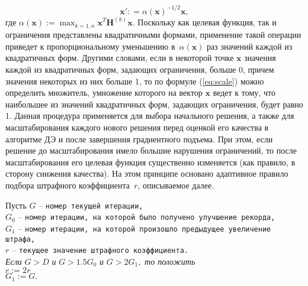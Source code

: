 \begin{equation}
    \textbf{x}': =\alpha(\textbf{x})^{-1/2} \textbf{x} ,
    \label{eq:scale}
\end{equation}
где $\alpha(\textbf{x}):=\max_{k=\overline{1,n}} \textbf{x}^T \textbf{H}^{(k)}\textbf{x}$. Поскольку как целевая функция, так и
ограничения представлены квадратичными формами, применение такой операции приведет к пропорциональному уменьшению
в~$\alpha(\textbf{x})$ раз значений каждой из квадратичных форм. Другими словами, если в некоторой точке $\textbf{x}$
значения каждой из квадратичных форм, задающих ограничения, больше 0, причем значения некоторых из них
больше 1, то по формуле (\ref{eq:scale}) можно определить множитель, умножение которого на вектор $\textbf{x}$ ведет к тому,
что наибольшее из значений квадратичных форм, задающих ограничения, будет равно 1. Данная процедура применяется для
выбора начального решения, а также для масштабирования каждого нового решения перед оценкой его качества в алгоритме ДЭ
и после завершения градиентного подъема.
При этом, если решение до масштабирования имело большие нарушения ограничений, то после масштабирования его целевая функция
существенно изменяется (как правило, в сторону снижения качества).
На этом принципе основано адаптивное правило подбора штрафного коэффициента~$r$, описываемое далее.


\begin{flushleft}
\small
Пусть
$G$ -- \verb"номер текущей итерации," \\
$G_0$ -- \verb"номер итерации, на которой было получено улучшение рекорда,"\\
$G_1$ -- \verb"номер итерации, на которой произошло предыдущее увеличение штрафа,"\\
$r$ -- \verb"текущее значение штрафного коэффициента."\\
$\mbox{ }$\\

\textit{Если} $G > D$ \textit{и} $G > 1.5 G_0$ \textit{и} $G > 2 G_1,$  \textit{то положить} \\
\leftskip=12pt
    $r := 2r$\\
    $G_1 := G.$\\
    \leftskip=0pt
\end{flushleft}

